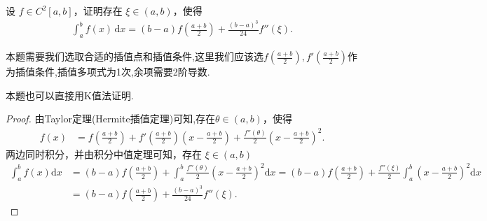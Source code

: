 \documentclass[../../main.tex]{subfiles}%
\begin{document}
\begin{example}
设 $f \in C^2[a, b]$，证明存在 $\xi \in (a, b)$，使得
\begin{align*}
\int_a^b f(x) \, \mathrm{d}x = (b - a) f \left( \frac{a + b}{2} \right) + \frac{(b - a)^3}{24} f''(\xi).
\end{align*}
\end{example}
\begin{note}
本题需要我们选取合适的插值点和插值条件,这里我们应该选$f(\frac{a+b}{2}),f'(\frac{a+b}{2})$作为插值条件,插值多项式为1次,余项需要2阶导数.
\end{note}
\begin{remark}
本题也可以直接用K值法证明.
\end{remark}
\begin{proof}
由Taylor定理(Hermite插值定理)可知,存在$\theta \in \left( a,b \right)$，使得
\begin{align*}
f\left( x \right) &= f\left( \frac{a+b}{2} \right) + f'\left( \frac{a+b}{2} \right) \left( x - \frac{a+b}{2} \right) + \frac{f'' \left( \theta \right)}{2}\left( x - \frac{a+b}{2} \right)^2.
\end{align*}
两边同时积分，并由积分中值定理可知，存在 $\xi \in \left( a,b \right)$
\begin{align*}
\int_a^b{f\left( x \right) \mathrm{d}x} &= \left( b-a \right) f\left( \frac{a+b}{2} \right) + \int_a^b{\frac{f'' \left( \theta \right)}{2}\left( x - \frac{a+b}{2} \right)^2 \mathrm{d}x}
= \left( b-a \right) f\left( \frac{a+b}{2} \right) + \frac{f'' \left( \xi \right)}{2} \int_a^b{\left( x - \frac{a+b}{2} \right)^2 \mathrm{d}x} \\
&= \left( b-a \right) f\left( \frac{a+b}{2} \right) + \frac{\left( b-a \right)^3}{24} f'' \left( \xi \right).
\end{align*}
\end{proof}
\end{document}
